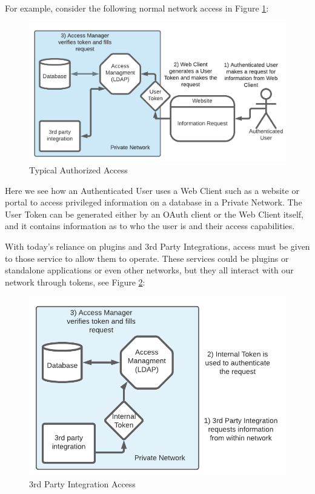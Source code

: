 \documentclass[runningheads]{llncs}
\begin{document}
For example, consider the following normal network access in Figure \ref{fig:NormalAccess}:

\begin{figure}
    \centering
    \includegraphics[width=\textwidth]{figures/NormalAccess2.png}
    \caption{Typical Authorized Access}
    \label{fig:NormalAccess}
\end{figure}

Here we see how an Authenticated User uses a Web Client such as a website or portal to access privileged information on a database in a Private Network. The User Token can be generated either by an OAuth client or the Web Client itself, and it contains information as to who the user is and their access capabilities. 

With today's reliance on plugins and 3rd Party Integrations, access must be given to those service to allow them to operate. These services could be plugins or standalone applications or even other networks, but they all interact with our network through tokens, see Figure \ref{fig:IntegrationAccess}:

\begin{figure}
    \centering
    \includegraphics[width=\textwidth]{figures/IntegrationAccess.png}
    \caption{3rd Party Integration Access}
    \label{fig:IntegrationAccess}
\end{figure}
\end{document}
